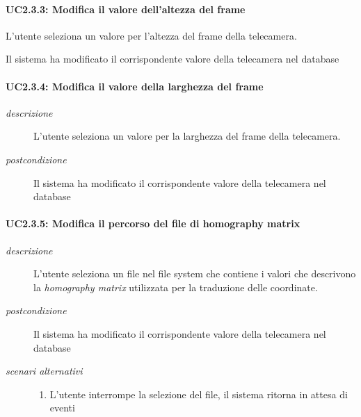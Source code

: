 \paragraph{UC2.3.3: Modifica il valore dell'altezza del frame}
\begin{description}  \label{sec:uc2.3.3}
 \item[\em{descrizione}] L'utente seleziona un valore per l'altezza del frame della telecamera.
   \item[\em{postcondizione}] Il sistema ha modificato il corrispondente valore della telecamera nel database
 \end{description}
 
\paragraph{UC2.3.4: Modifica il valore della larghezza del frame}  \label{sec:uc2.3.4}
\begin{description}
 \item[\em{descrizione}] L'utente seleziona un valore per la larghezza del frame della telecamera.
   \item[\em{postcondizione}] Il sistema ha modificato il corrispondente valore della telecamera nel database
 \end{description}
 
 \paragraph{UC2.3.5: Modifica il percorso del file di homography matrix} \label{sec:uc2.3.5}
\begin{description}
 \item[\em{descrizione}] L'utente seleziona un file nel file system che contiene i valori che descrivono la  \textit{homography matrix} utilizzata per la traduzione delle coordinate.
   \item[\em{postcondizione}] Il sistema ha modificato il corrispondente valore della telecamera nel database
   \item[\em{scenari alternativi}] \mbox{}
  \begin{enumerate}
  \item L'utente interrompe la selezione del file, il sistema ritorna in attesa di eventi
  \end{enumerate}
 \end{description}
 
 
